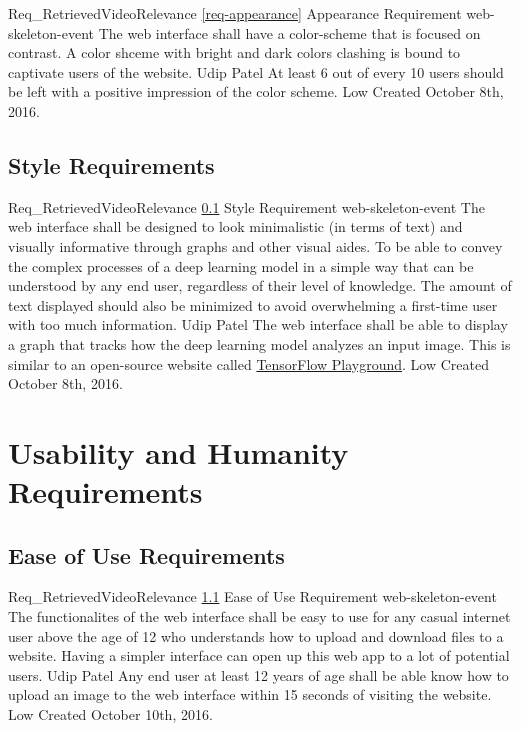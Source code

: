 \documentclass{scrreprt}
\begin{document}
\requirement
{Req_RetrievedVideoRelevance}
{\ref{req-appearance} Appearance Requirement}
{web-skeleton-event} %
{The web interface shall have a color-scheme that is focused on contrast.}
{A color shceme with bright and dark colors clashing is bound to captivate users of the website.}
{Udip Patel}
{At least 6 out of every 10 users should be left with a positive impression of the color scheme.}
{Low}
{Created October 8th, 2016.}

\subsection{Style Requirements}
\label{req-style}

\requirement
{Req_RetrievedVideoRelevance}
{\ref{req-style} Style Requirement}
{web-skeleton-event} %
{The web interface shall be designed to look minimalistic (in terms of text) and visually informative through graphs and other visual aides.}
{To be able to convey the complex processes of a deep learning model in a simple way that can be understood by any end user, regardless of their level of knowledge. The amount of text displayed should also be minimized to avoid overwhelming a first-time user with too much information.}
{Udip Patel}
{The web interface shall be able to display a graph that tracks how the deep learning model analyzes an input image. This is similar to an open-source website called \href{http://playground.tensorflow.org/}{TensorFlow Playground}.}
{Low}
{Created October 8th, 2016.}

\section{Usability and Humanity Requirements}

\subsection{Ease of Use Requirements}
\label{req-ease-of-use}

\requirement
{Req_RetrievedVideoRelevance}
{\ref{req-ease-of-use} Ease of Use Requirement}
{web-skeleton-event} %
{The functionalites of the web interface shall be easy to use for any casual internet user above the age of 12 who understands how to upload and download files to a website.}
{Having a simpler interface can open up this web app to a lot of potential users.}
{Udip Patel}
{Any end user at least 12 years of age shall be able know how to upload an image to the web interface within 15 seconds of visiting the website.}
{Low}
{Created October 10th, 2016.}
\end{document}
